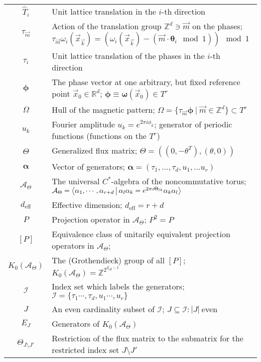 \documentclass[
    aps,
    prb,
    twocolumn,
    floatfix,
    superscriptaddress,
	10pt
]{revtex4-2}
\begin{document}
\begin{table*}[t!]
\begin{tabular}{c|p{15cm}}
	$\hat{T}_{i}$ & Unit lattice translation in the $i$-th direction\\
	$\tau_{\vec{m}}$ & Action of the translation group $\mathbb{Z}^d \ni \vec{m} $ on the phases;  $  \tau_{\vec{m}}\omega_i (\vec{x}_\vec{k}) = ( \omega_i (\vec{x}_\vec{k} ) - ( \vec{m} \cdot \boldsymbol{\theta}_i \mod 1) ) \mod 1 $ \\
	$\tau_{i}$ & Unit lattice translation of the phases in the $i$-th direction\\
	$\boldsymbol{\phi} $ & The phase vector at one arbitrary, but fixed reference point $\vec{x}_0 \in \mathbb{R}^d$; $\boldsymbol{\phi} \equiv \boldsymbol{\omega}(\vec{x}_0) \in T^r$ \\
	$\Omega $ & Hull of the magnetic pattern;  $\Omega =  \lbrace \tau_{\vec{m}}\boldsymbol{\phi} ~|~ \vec{m} \in \mathbb{Z}^d \rbrace  \subset T^r $  \\
	$u_k$ & Fourier amplitude $u_k = e^{ 2 \pi i \phi_k}$; generator of periodic functions (functions on the $T^r$) \\
	$\Theta $ & Generalized flux matrix; $\Theta = ( (0, -\theta^T), (\theta,0))$ \\
	$\boldsymbol{\alpha}$ & Vector of generators; $\boldsymbol{\alpha}=(\tau_1, \ldots, \tau_d, u_1,\ldots u_r )$ \\
	$\mathcal{A}_\Theta $ & The universal $C^\ast$-algebra of the noncommutative torus; $\mathcal{A}_\Theta = \Braket{ \alpha_1, \cdots, \alpha_{r+d}
    |  \alpha_l \alpha_k = e^{ 2 \pi i \Theta_{lk}} \alpha_k  \alpha_l }$\\
	$d_{\mathrm{eff}} $ & Effective dimension; $d_{\mathrm{eff}} = r+d $ \\
	$P$ & Projection operator in $\mathcal{A}_\Theta$; $P^2 = P$ \\
	$[P]$ & Equivalence class of unitarily equivalent projection operators in $\mathcal{A}_\Theta$; \\
	$K_0(\mathcal{A}_\Theta) $ & The (Grothendieck) group of all $[P]$; $K_0(\mathcal{A}_\Theta)  = \mathbb{Z}^{2^{d_\mathrm{eff}-1}}$ \\
	$\mathcal{I}$ & Index set which labels the generators; $\mathcal{I}=\lbrace \tau_1 \cdots, \tau_d, u_1  \cdots, u_r \rbrace$ 
	\\
	$J$ & An even cardinality subset of $\mathcal{I}$; $ J \subseteq \mathcal{I} \colon |J|~\mathrm{even}$ \\
	$E_J$ & Generators of $K_0(\mathcal{A}_\Theta) $ \\ 
	$\Theta_{J\setminus J'}$ & Restriction of the flux matrix to the submatrix for the restricted index set $J \setminus J'$ \\

\end{tabular}
\end{table*}
\end{document}
